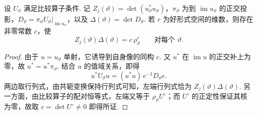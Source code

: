 \begin{lemma}
\label{lem:c-compression-identity}
\emitthmsource
设 $U_\vartheta$ 满足比较算子条件. 记 $Z_j(\vartheta)=\det(u_\vartheta^*u_\vartheta)$，$\pi_\vartheta$ 为到 $\operatorname{im}u_\vartheta$ 的正交投影，$D_\vartheta=\pi_\vartheta U_\vartheta|_{\operatorname{im}u_\vartheta}$，以及 $\Delta(\vartheta)=\det D_\vartheta$. 若 $r$ 为好形式空间的维数，则存在非零常数 $c$，使
\begin{equation}
 Z_j(\vartheta)\Delta(\vartheta)=c\,\rho_\vartheta^r
 \qquad\text{对每个 }\vartheta .
\label{eq:c-compression}
\end{equation}
\end{lemma}
\begin{proof}
由于 $u=u_\vartheta$ 单射，它诱导到自身像的同构 $e$. 又 $u^*$ 在 $\operatorname{im}u$ 的正交补上为零，故 $u^*=u^*\pi_\vartheta$. 结合 $u$ 的值域关系，即得
\[
 u^*U_\vartheta u=(u^*u)\,e^{-1}D_\vartheta e .
\]
两边取行列式，由共轭变换保持行列式可知，左端行列式恰为 $Z_j(\vartheta)\Delta(\vartheta)$. 另一方面，由比较算子的配对恒等式，左端又等于 $\rho_\vartheta U^\circ$；而 $U^\circ$ 的正定性保证其核为零，故取 $c=\det U^\circ\ne0$ 即得所证.
\end{proof}

